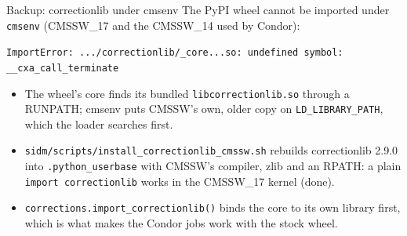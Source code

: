 \documentclass[aspectratio=169,11pt]{beamer}
\newcommand{\code}[1]{{\small\colorbox{codebg}{\texttt{#1}}}}
\begin{document}
\appendix
\begin{frame}{Backup: correctionlib under cmsenv}
  The PyPI wheel cannot be imported under \code{cmsenv} (CMSSW\_17 and the CMSSW\_14 used by Condor):

  \vspace{0.2em}
  {\scriptsize\texttt{ImportError: .../correctionlib/\_core...so: undefined symbol: \_\_cxa\_call\_terminate}}

  \vspace{0.4em}
  \small
  \begin{itemize}
    \item The wheel's core finds its bundled \code{libcorrectionlib.so} through a RUNPATH; cmsenv
          puts CMSSW's own, older copy on \code{LD\_LIBRARY\_PATH}, which the loader searches first.
    \item \code{sidm/scripts/install\_correctionlib\_cmssw.sh} rebuilds correctionlib 2.9.0 into
          \code{.python\_userbase} with CMSSW's compiler, zlib and an RPATH: a plain
          \code{import correctionlib} works in the CMSSW\_17 kernel (done).
    \item \code{corrections.import\_correctionlib()} binds the core to its own library first,
          which is what makes the Condor jobs work with the stock wheel.
  \end{itemize}
\end{frame}
\end{document}

